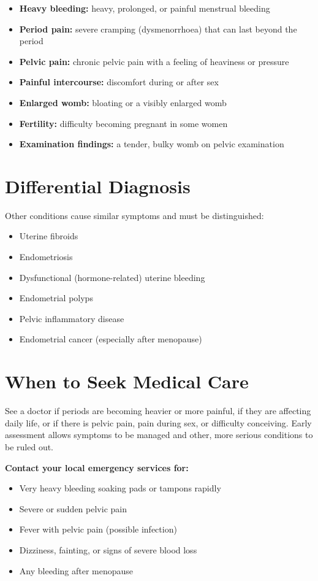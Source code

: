 \begin{itemize}
    \item \textbf{Heavy bleeding:} heavy, prolonged, or painful menstrual bleeding
    \item \textbf{Period pain:} severe cramping (dysmenorrhoea) that can last beyond the period
    \item \textbf{Pelvic pain:} chronic pelvic pain with a feeling of heaviness or pressure
    \item \textbf{Painful intercourse:} discomfort during or after sex
    \item \textbf{Enlarged womb:} bloating or a visibly enlarged womb
    \item \textbf{Fertility:} difficulty becoming pregnant in some women
    \item \textbf{Examination findings:} a tender, bulky womb on pelvic examination
\end{itemize}

\section*{Differential Diagnosis}
Other conditions cause similar symptoms and must be distinguished:

\begin{itemize}
    \item Uterine fibroids
    \item Endometriosis
    \item Dysfunctional (hormone-related) uterine bleeding
    \item Endometrial polyps
    \item Pelvic inflammatory disease
    \item Endometrial cancer (especially after menopause)
\end{itemize}

\section*{When to Seek Medical Care}
See a doctor if periods are becoming heavier or more painful, if they are affecting daily life, or if there is pelvic pain, pain during sex, or difficulty conceiving. Early assessment allows symptoms to be managed and other, more serious conditions to be ruled out.

\textbf{Contact your local emergency services for:}
\begin{itemize}
    \item Very heavy bleeding soaking pads or tampons rapidly
    \item Severe or sudden pelvic pain
    \item Fever with pelvic pain (possible infection)
    \item Dizziness, fainting, or signs of severe blood loss
    \item Any bleeding after menopause
\end{itemize}

